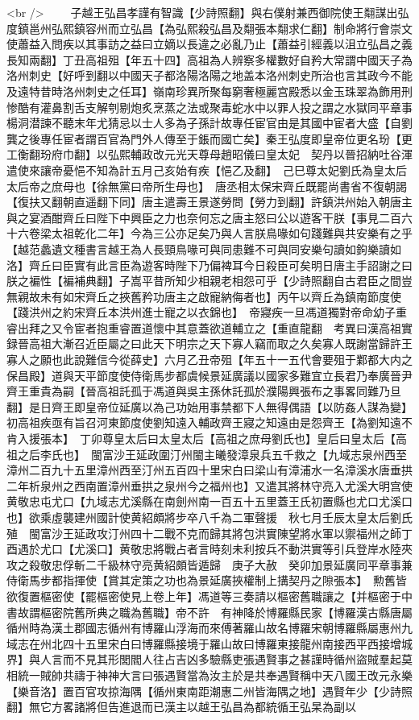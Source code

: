 <br />
　　子越王弘昌孝謹有智識【少詩照翻】與右僕射兼西御院使王翷謀出弘度鎮邕州弘熙鎮容州而立弘昌【為弘熙殺弘昌及翷張本翷求仁翻】制命將行會崇文使蕭益入問疾以其事訪之益曰立嫡以長違之必亂乃止【蕭益引經義以沮立弘昌之義長知兩翻】丁丑高祖殂【年五十四】高祖為人辨察多權數好自矜大常謂中國天子為洛州刺史【好呼到翻以中國天子都洛陽洛陽之地盖本洛州刺史所治也言其政今不能及遠特昔時洛州刺史之任耳】嶺南珍異所聚每窮奢極麗宫殿悉以金玉珠翠為飾用刑惨酷有灌鼻割舌支解刳剔炮炙烹蒸之法或聚毒蛇水中以罪人投之謂之水獄同平章事楊洞潜諫不聽末年尤猜忌以士人多為子孫計故專任宦官由是其國中宦者大盛【自劉龔之後專任宦者謂百官為門外人傳至于鋹而國亡矣】秦王弘度即皇帝位更名玢【更工衡翻玢府巾翻】以弘熙輔政改元光天尊母趙昭儀曰皇太妃　契丹以晉招納吐谷渾遣使來讓帝憂悒不知為計五月己亥始有疾【悒乙及翻】　己巳尊太妃劉氏為皇太后太后帝之庶母也【徐無黨曰帝所生母也】　唐丞相太保宋齊丘既罷尚書省不復朝謁【復扶又翻朝直遥翻下同】唐主遣壽王景遂勞問【勞力到翻】許鎮洪州始入朝唐主與之宴酒酣齊丘曰陛下中興臣之力也奈何忘之唐主怒曰公以遊客干朕【事見二百六十六卷梁太祖乾化二年】今為三公亦足矣乃與人言朕鳥喙如句踐難與共安樂有之乎【越范蠡遺文種書言越王為人長頸鳥喙可與同患難不可與同安樂句讀如鉤樂讀如洛】齊丘曰臣實有此言臣為遊客時陛下乃偏裨耳今日殺臣可矣明日唐主手詔謝之曰朕之褊性【褊補典翻】子嵩平昔所知少相親老相怨可乎【少詩照翻自古君臣之間豈無親故未有如宋齊丘之挾舊矜功唐主之啟寵納侮者也】丙午以齊丘為鎮南節度使【踐洪州之約宋齊丘本洪州進士寵之以衣錦也】　帝寢疾一旦馮道獨對帝命幼子重睿出拜之又令宦者抱重睿置道懷中其意蓋欲道輔立之【重直龍翻　考異曰漢高祖實録晉高祖大漸召近臣屬之曰此天下明宗之天下寡人竊而取之久矣寡人既謝當歸許王寡人之願也此說難信今從薛史】六月乙丑帝殂【年五十一五代會要殂于鄴都大内之保昌殿】道與天平節度使侍衛馬步都虞候景延廣議以國家多難宜立長君乃奉廣晉尹齊王重貴為嗣【晉高祖託孤于馮道與吳主孫休託孤於濮陽興張布之事畧同難乃旦翻】是日齊王即皇帝位延廣以為己功始用事禁都下人無得偶語【以防姦人謀為變】初高祖疾亟有旨召河東節度使劉知遠入輔政齊王寢之知遠由是怨齊王【為劉知遠不肯入援張本】　丁卯尊皇太后曰太皇太后【高祖之庶母劉氏也】皇后曰皇太后【高祖之后李氏也】　閩富沙王延政圍汀州閩主曦發漳泉兵五千救之【九域志泉州西至漳州二百九十五里漳州西至汀州五百四十里宋白曰梁山有漳浦水一名漳溪水唐垂拱二年析泉州之西南置漳州垂拱之泉州今之福州也】又遣其將林守亮入尤溪大明宫使黄敬忠屯尤口【九域志尤溪縣在南劍州南一百五十五里蓋王氏初置縣也尤口尤溪口也】欲乘虛襲建州國計使黄紹頗將步卒八千為二軍聲援　秋七月壬辰太皇太后劉氏殖　閩富沙王延政攻汀州四十二戰不克而歸其將包洪實陳望將水軍以禦福州之師丁酉遇於尤口【尤溪口】黄敬忠將戰占者言時刻未利按兵不動洪實等引兵登岸水陸夾攻之殺敬忠俘斬二千級林守亮黄紹頗皆遁歸　庚子大赦　癸卯加景延廣同平章事兼侍衛馬步都指揮使【賞其定策之功也為景延廣挾權制上搆契丹之隙張本】　勲舊皆欲復置樞密使【罷樞密使見上卷上年】馮道等三奏請以樞密舊職讓之【并樞密于中書故謂樞密院舊所典之職為舊職】帝不許　有神降於博羅縣民家【博羅漢古縣唐屬循州時為漢土郡國志循州有博羅山浮海而來傅著羅山故名博羅宋朝博羅縣屬惠州九域志在州北四十五里宋白曰博羅縣接境于羅山故曰博羅東接龍州南接西平西接增城界】與人言而不見其形閭閻人往占吉凶多驗縣吏張遇賢事之甚謹時循州盜賊羣起莫相統一賊帥共禱于神神大言曰張遇賢當為汝主於是共奉遇賢稱中天八國王改元永樂【樂音洛】置百官攻掠海隅【循州東南距潮惠二州皆海隅之地】遇賢年少【少詩照翻】無它方畧諸將但告進退而已漢主以越王弘昌為都統循王弘杲為副以